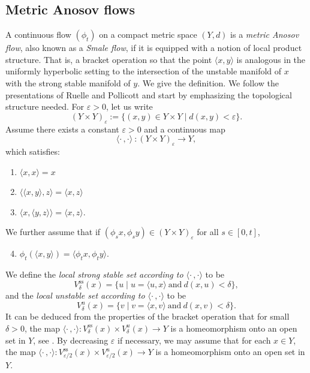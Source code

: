 \documentclass[10pt]{amsart}
\let\epsilon\varepsilon
\let\sep\mid
\newcommand{\lrangle}{\langle\cdot\,,\cdot\rangle}
\newenvironment{enumeratea}
{\bgroup\def\theenumi{\alph{enumi}}\begin{enumerate}}
{\end{enumerate}\egroup}
\newcommand{\sts}{\mathrm{ss}}
\theoremstyle{definition}
\numberwithin{equation}{section}
\begin{document}
\subsection{Metric Anosov flows}\label{sec:smale}
A continuous flow $(\phi_t)$ on a compact metric space $(Y, d)$ is a \emph{metric Anosov flow}, also known as a \emph{Smale flow}, if it is equipped with a notion of local product structure. That is, a bracket operation so that the point $\langle x,y\rangle $ is analogous in the uniformly hyperbolic setting to the intersection of the unstable manifold of $x$ with the strong stable manifold of $y$. We give the definition. We follow the presentations of Ruelle and Pollicott and start by emphasizing the topological structure needed. For $\epsilon>0$, let us write
\[ (Y \times Y)_\epsilon := \{(x,y) \in Y \times Y \sep d(x,y) < \epsilon\}. \]
Assume there exists a constant $\epsilon>0$ and a continuous map
\[ \lrangle ~: (Y \times Y)_\epsilon \to Y, \]
which satisfies:
\begin{enumeratea}
\item\label{enum:a} $\langle x,x\rangle =x$
\item\label{enum:b} $\langle \langle x,y\rangle,z\rangle =\langle x, z\rangle $
\item\label{enum:c} $\langle x, \langle y,z\rangle \rangle =\langle x, z\rangle $.
\end{enumeratea}
\noindent
We further assume that if $(\phi_sx,\phi_sy) \in (Y\times Y)_\epsilon$ for all $s\in[0,t]$,
\begin{enumeratea}\setcounter{enumi}{3}
\item\label{enum:d}$\phi_t(\langle x,y \rangle)= \langle \phi_tx, \phi_ty \rangle$.
\end{enumeratea}
\noindent
We define the \emph{local strong stable set according to $\lrangle $} to be
\[ V^{\sts}_\delta (x) = \{ u \sep u = \langle u,x\rangle \mathrm{ ~and~ } d(x, u)< \delta \}, \]
and the \emph{local unstable set according to $\lrangle $} to be
\[ V^{u}_\delta (x) = \{ v \sep v = \langle x,v\rangle \mathrm{ ~and~ } d(x, v)< \delta \}. \]
It can be deduced from the properties of the bracket operation that for small $\delta>0$, the map $\lrangle : V^{\sts}_{\delta} (x) \times V^{u}_{\delta} (x) \to Y$ is a homeomorphism onto an open set in $Y$, see \cite[\S7.1]{Ruelle}.
By decreasing $\epsilon$ if necessary, we may assume that for each $x \in Y$, the map $\lrangle : V^{\sts}_{\epsilon/2} (x) \times V^{u}_{\epsilon/2} (x) \to Y$ is a homeomorphism onto an open set in $Y$.
\end{document}
